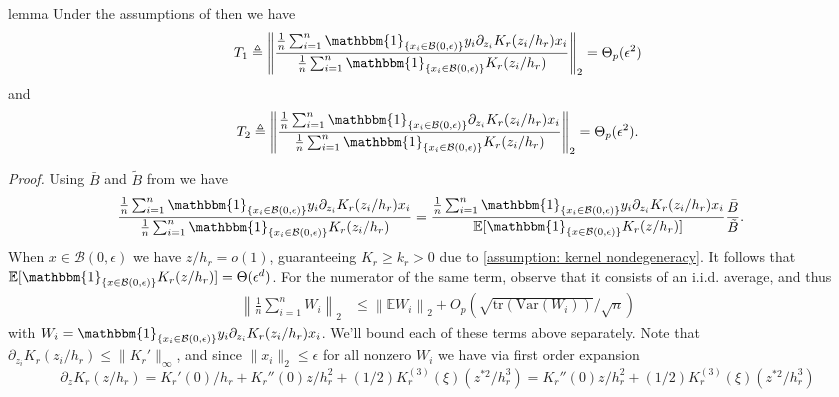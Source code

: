 \documentclass[11pt]{article}
\begin{document}
\begin{restatable}{lemma}{} \label{lemma: psi asymptotics}
    Under the assumptions of  then we have \begin{align*}
    T_1 \triangleq \left\|\frac{\frac{1}{n}\sum_{i = 1}^n\mathbbm{1}_{\{x_i \in \mathcal{B}(0, \epsilon)\}}y_i\partial_{z_i}K_r(z_i/h_r)x_i}{\frac{1}{n}\sum_{i = 1}^n\mathbbm{1}_{\{x_i \in \mathcal{B}(0, \epsilon)\}}K_r(z_i/h_r)}\right\|_2 = \Theta_p(\epsilon^2)
    \end{align*}
    and 
    \begin{align*}
    T_2 \triangleq\left\|\frac{\frac{1}{n}\sum_{i = 1}^n\mathbbm{1}_{\{x_i \in \mathcal{B}(0, \epsilon)\}}\partial_{z_i}K_r(z_i/h_r)x_i}{\frac{1}{n}\sum_{i = 1}^n\mathbbm{1}_{\{x_i \in \mathcal{B}(0, \epsilon)\}}K_r(z_i/h_r)}\right\|_2 = \Theta_p(\epsilon^2).
    \end{align*}
\end{restatable}
\noindent \textit{Proof.} Using $\bar{B}$ and $\tilde{B}$ from  we have
\begin{align}
    \frac{\frac{1}{n}\sum_{i = 1}^n\mathbbm{1}_{\{x_i \in \mathcal{B}(0, \epsilon)\}}y_i\partial_{z_i}K_r(z_i/h_r)x_i}{\frac{1}{n}\sum_{i = 1}^n\mathbbm{1}_{\{x_i \in \mathcal{B}(0, \epsilon)\}}K_r(z_i/h_r)} &= \frac{\frac{1}{n}\sum_{i = 1}^n\mathbbm{1}_{\{x_i \in \mathcal{B}(0, \epsilon)\}}y_i\partial_{z_i}K_r(z_i/h_r)x_i}{\mathbb{E}[\mathbbm{1}_{\{x \in \mathcal{B}(0, \epsilon)\}}K_r(z/h_r)]}\frac{\bar{B}}{\tilde{B}}. 
\end{align}
When $x \in \mathcal{B}(0, \epsilon)$ we have $z/h_r = o(1)$, guaranteeing $K_r \geq k_r > 0$ due to \cref{assumption: kernel nondegeneracy}. It follows that $\mathbb{E}[\mathbbm{1}_{\{x \in \mathcal{B}(0, \epsilon)\}}K_r(z/h_r)] = \Theta(\epsilon^d)$. For the numerator of the same term, observe that it consists of an i.i.d. average, and thus
\begin{align}
    \left\|\frac{1}{n}\sum_{i = 1}^nW_i\right\|_2 &\leq \left\|\mathbb{E}W_i\right\|_2 + O_p\left(\sqrt{\text{tr}(\text{Var}(W_i))}/\sqrt{n}\right) \label{eq: W_i bound}
\end{align}
with $W_i = \mathbbm{1}_{\{x_i \in \mathcal{B}(0, \epsilon)\}}y_i\partial_{z_i}K_r(z_i/h_r)x_i$. We'll bound each of these terms above separately. Note that $\partial_{z_i}K_r(z_i/h_r) \leq \|K_r'\|_{\infty}$, and since $\|x_i\|_2 \leq \epsilon$ for all nonzero $W_i$ we have via first order expansion
\[\partial_{z}K_r(z/h_r) = K_r'(0)/h_r + K_r''(0)z/h_r^2 + (1/2)K^{(3)}_r(\xi)(z^{*2}/h_r^3) = K_r''(0)z/h_r^2 + (1/2)K^{(3)}_r(\xi)(z^{*2}/h_r^3)\]
\end{document}
